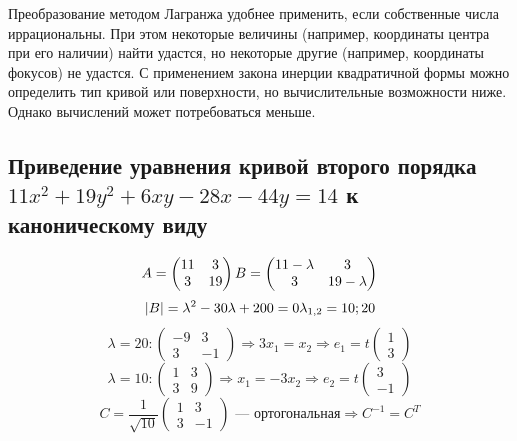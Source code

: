 \documentclass[12pt]{article}
\begin{document}
    Преобразование методом Лагранжа удобнее применить, если собственные числа иррациональны. При этом некоторые величины (например, координаты центра при его наличии) найти удастся, но некоторые другие (например, координаты фокусов) не удастся. С применением закона инерции квадратичной формы можно определить тип кривой или поверхности, но вычислительные возможности ниже. Однако вычислений может потребоваться меньше.

    \subsection{Приведение уравнения кривой второго порядка $11x^2 + 19y^2 + 6xy - 28x - 44y = 14$ к каноническому виду}
    \[
        A = \begin{pmatrix}
            11 & 3  \\
            3  & 19
        \end{pmatrix}
        \\
        B = \begin{pmatrix}
            11 - \lambda & 3            \\
            3            & 19 - \lambda
        \end{pmatrix}
    \]
    \[
        |B| = \lambda^2 - 30\lambda + 200 = 0
        \\ \lambda_{1, 2} = 10; 20
    \]
    \[
        \lambda = 20:
        \begin{pmatrix}
            -9 & 3  \\
            3  & -1
        \end{pmatrix}
        \Rightarrow
        3x_1 = x_2
        \Rightarrow
        e_1 = t\begin{pmatrix}1 \\ 3\end{pmatrix}
    \]
    \[
        \lambda = 10:
        \begin{pmatrix}
            1 & 3 \\
            3 & 9
        \end{pmatrix}
        \Rightarrow
        x_1 = -3x_2
        \Rightarrow
        e_2  = t\begin{pmatrix}3 \\ -1\end{pmatrix}
    \]
    \[
        C = \dfrac{1}{\sqrt{10}}\begin{pmatrix}
            1 & 3  \\
            3 & -1
        \end{pmatrix} \text{ — ортогональная}
        \Rightarrow
        C^{-1} = C^T
    \]
\end{document}
